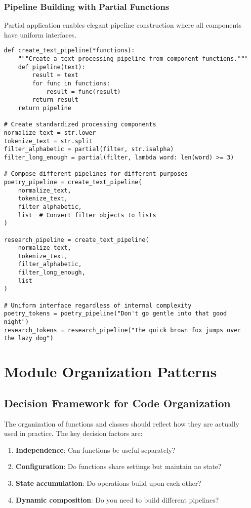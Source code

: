 \documentclass[11pt,a4paper]{article}
\begin{document}
\subsubsection{Pipeline Building with Partial Functions}

Partial application enables elegant pipeline construction where all components have uniform interfaces.

\begin{lstlisting}[caption=Pipeline construction with partial application]
def create_text_pipeline(*functions):
    """Create a text processing pipeline from component functions."""
    def pipeline(text):
        result = text
        for func in functions:
            result = func(result)
        return result
    return pipeline

# Create standardized processing components
normalize_text = str.lower
tokenize_text = str.split
filter_alphabetic = partial(filter, str.isalpha)
filter_long_enough = partial(filter, lambda word: len(word) >= 3)

# Compose different pipelines for different purposes
poetry_pipeline = create_text_pipeline(
    normalize_text,
    tokenize_text,
    filter_alphabetic,
    list  # Convert filter objects to lists
)

research_pipeline = create_text_pipeline(
    normalize_text,
    tokenize_text,
    filter_alphabetic,
    filter_long_enough,
    list
)

# Uniform interface regardless of internal complexity
poetry_tokens = poetry_pipeline("Don't go gentle into that good night")
research_tokens = research_pipeline("The quick brown fox jumps over the lazy dog")
\end{lstlisting}

\section{Module Organization Patterns}

\subsection{Decision Framework for Code Organization}

The organization of functions and classes should reflect how they are actually used in practice. The key decision factors are:

\begin{enumerate}
\item \textbf{Independence}: Can functions be useful separately?
\item \textbf{Configuration}: Do functions share settings but maintain no state?
\item \textbf{State accumulation}: Do operations build upon each other?
\item \textbf{Dynamic composition}: Do you need to build different pipelines?
\end{enumerate}
\end{document}
